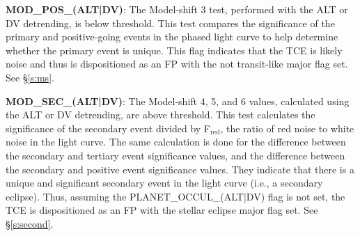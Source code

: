 
\textbf{MOD\_POS\_(ALT|DV)}: The Model-shift 3 test, performed with the ALT or DV detrending, is below threshold. This test compares the significance of the primary and positive-going events in the phased light curve to help determine whether the primary event is unique. This flag indicates that the TCE is likely noise and thus is dispositioned as an FP with the not transit-like major flag set. See \S\ref{s:ms}.


\textbf{MOD\_SEC\_(ALT|DV)}: The Model-shift 4, 5, and 6 values, calculated using the ALT or DV detrending, are above threshold. This test calculates the significance of the secondary event divided by F$_{\mathrm{red}}$, the ratio of red noise to white noise in the light curve. The same calculation is done for the difference between the secondary and tertiary event significance values, and the difference between the secondary and positive event significance values. They indicate that there is a unique and significant secondary event in the light curve (i.e., a secondary eclipse). Thus, assuming the PLANET\_OCCUL\_(ALT|DV) flag is not set, the TCE is dispositioned as an FP with the stellar eclipse major flag set. See \S\ref{s:second}.



